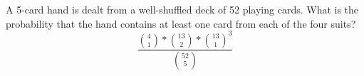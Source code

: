 \item A 5-card hand is dealt from a well-shuffled deck of 52 playing cards. What is the probability that the hand contains at least one card from each of the four suits?
\[ \frac{\binom{4}{1} * \binom{13}{2} * \binom{13}{1}^3}{\binom{52}{5}} \]